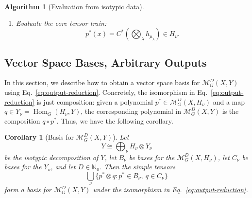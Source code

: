 \documentclass[11pt]{article}
\newcommand{\dsN}{\mathbb{N}}
\newcommand{\scM}{\mathcal{M}}
\newcommand{\HomG}[2]{\operatorname{Hom}_G\!\left(#1,#2\right)}
\newtheorem{corollary}[theorem]{Corollary}
\newtheorem{algorithm}[theorem]{Algorithm}
\theoremstyle{definition}
\begin{document}
\begin{algorithm}[Evaluation from isotypic data]
\begin{enumerate}[label=\textbf{Step \arabic*.},leftmargin=2.8cm]
\begin{enumerate}[label=\textup{(\alph*)},leftmargin=2.2em]
      \item Evaluate each column leaf tensor train in the tensor-tree representation of $L_\lambda^*$ on the relevant row-linear combinations, using the explicit alternating sum for the column antisymmetrizer.
      If a column has height $h$, this uses the Waring-grid rows attached to the first $h$ tableau rows.

      \item Evaluate the interior tensor train of $L_\lambda^*$ on the column-leaf outputs.
      The same Waring-grid row is shared across every tensor slot belonging to a tableau row.
      Sum over all choices of Waring-grid rows, weighted by the product of the corresponding coefficients $b_w$, and include the normalizing constants from Eq.~\eqref{eq:waring-monomial} if normalized Young symmetrizers are desired.
      The result is
      \[
        h_{\mu_\lambda}
        =
        L_\lambda^*e_{\pi_\lambda}^*T_\lambda^*(x_\lambda^{\otimes d_\lambda})
        \in H_{\mu_\lambda}.
      \]
    \end{enumerate}

    \item Evaluate the core tensor train:
    \[
      p^*(x)
      =
      C^*\left(\bigotimes_\lambda h_{\mu_\lambda}\right)
      \in H_\nu.
    \]
  \end{enumerate}
\end{algorithm}



\subsection{Vector Space Bases, Arbitrary Outputs}\label{sec:arbitrary-bases}

In this section, we describe how to obtain a vector space basis for $\scM_G^D(X,Y)$ using Eq.~\eqref{eq:output-reduction}.
Concretely, the isomorphism in Eq.~\eqref{eq:output-reduction} is just composition: given a polynomial $p^* \in \scM_G^D(X,H_\nu)$ and a map $q \in Y_\nu = \HomG{H_\nu}{Y}$, the corresponding polynomial in $\scM_G^D(X,Y)$ is the composition $q \circ p^*$.
Thus, we have the following corollary.

\begin{corollary}[Basis for $\scM_G^D(X,Y)$]\label{cor:arbitrary-output-basis}
  Let
  \[
    Y\cong \bigoplus_{\nu} H_\nu\otimes Y_\nu
  \]
  be the isotypic decomposition of $Y$, let $B_\nu$ be bases for the $\scM_G^D(X,H_\nu)$, let $C_\nu$ be bases for the $Y_\nu$, and let $D\in\dsN_0$.
  Then the simple tensors
  \[
    \bigcup_{\nu}\{p^*\otimes q : p^*\in B_\nu,\ q\in C_\nu\}
  \]
  form a basis for $\scM_G^D(X,Y)$ under the isomorphism in Eq.~\eqref{eq:output-reduction}.
\end{corollary}
\end{document}
